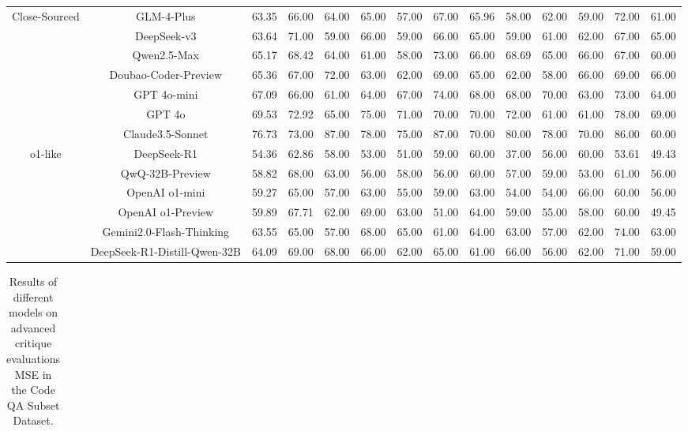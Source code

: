 \documentclass[11pt, a4paper, logo, copyright, nonumbering, amsart]{map}
\begin{document}
\begin{CJK*}{UTF8}{gbsn}
\begin{table*}[h!]
\begin{adjustbox}{width=\textwidth}
\begin{tabular}{c|c|cccccccccccc}
    \midrule
    \multirow{7}{*}{Close-Sourced}
    & GLM-4-Plus & 63.35 & 66.00 & 64.00 & 65.00 & 57.00 & 67.00 & 65.96 & 58.00 & 62.00 & 59.00 & 72.00 & 61.00 \\
    & DeepSeek-v3 & 63.64 & 71.00 & 59.00 & 66.00 & 59.00 & 66.00 & 65.00 & 59.00 & 61.00 & 62.00 & 67.00 & 65.00 \\
    & Qwen2.5-Max & 65.17 & 68.42 & 64.00 & 61.00 & 58.00 & 73.00 & 66.00 & 68.69 & 65.00 & 66.00 & 67.00 & 60.00 \\
    & Doubao-Coder-Preview & 65.36 & 67.00 & 72.00 & 63.00 & 62.00 & 69.00 & 65.00 & 62.00 & 58.00 & 66.00 & 69.00 & 66.00 \\
    & GPT 4o-mini & 67.09 & 66.00 & 61.00 & 64.00 & 67.00 & 74.00 & 68.00 & 68.00 & 70.00 & 63.00 & 73.00 & 64.00 \\
    & GPT 4o & 69.53 & 72.92 & 65.00 & 75.00 & 71.00 & 70.00 & 70.00 & 72.00 & 61.00 & 61.00 & 78.00 & 69.00 \\
    & Claude3.5-Sonnet & 76.73 & 73.00 & 87.00 & 78.00 & 75.00 & 87.00 & 70.00 & 80.00 & 78.00 & 70.00 & 86.00 & 60.00 \\
    
    \midrule
    \multirow{6}{*}{o1-like}
    & DeepSeek-R1 & 54.36 & 62.86 & 58.00 & 53.00 & 51.00 & 59.00 & 60.00 & 37.00 & 56.00 & 60.00 & 53.61 & 49.43 \\
    & QwQ-32B-Preview & 58.82 & 68.00 & 63.00 & 56.00 & 58.00 & 56.00 & 60.00 & 57.00 & 59.00 & 53.00 & 61.00 & 56.00 \\
    & OpenAI o1-mini & 59.27 & 65.00 & 57.00 & 63.00 & 55.00 & 59.00 & 63.00 & 54.00 & 54.00 & 66.00 & 60.00 & 56.00 \\
    & OpenAI o1-Preview & 59.89 & 67.71 & 62.00 & 69.00 & 63.00 & 51.00 & 64.00 & 59.00 & 55.00 & 58.00 & 60.00 & 49.45 \\
    & Gemini2.0-Flash-Thinking & 63.55 & 65.00 & 57.00 & 68.00 & 65.00 & 61.00 & 64.00 & 63.00 & 57.00 & 62.00 & 74.00 & 63.00 \\
    & DeepSeek-R1-Distill-Qwen-32B & 64.09 & 69.00 & 68.00 & 66.00 & 62.00 & 65.00 & 61.00 & 66.00 & 56.00 & 62.00 & 71.00 & 59.00 \\
    \bottomrule
    \end{tabular}
    \end{adjustbox}
\end{table*}

\begin{table*}[h!]
    \centering
    \caption{Results of different models on advanced critique evaluations MSE in the Code QA Subset Dataset.} \label{table:real_level2}
    \begin{adjustbox}{width=\textwidth}
    \begin{tabular}{c|c|cccccccccccc}
    

\end{tabular}
\end{adjustbox}
\end{table*}
\end{CJK*}
\end{document}
